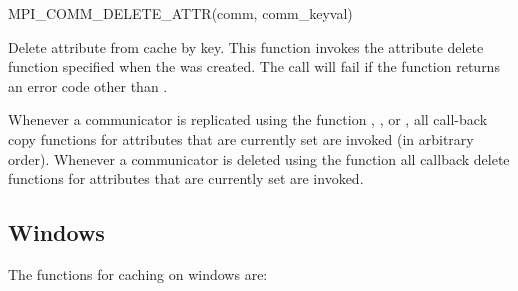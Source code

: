 %
\begin{funcdef}{MPI\_COMM\_DELETE\_ATTR}{(\mbox{comm}, \mbox{comm\_keyval})}
\end{funcdef}

Delete attribute from cache by key. This function invokes the
attribute delete function 
specified when the  was created.
The call will fail if the  function returns an
error code other than .

Whenever a communicator is replicated using the function
, ,
 or ,
all call-back copy functions for attributes
that are currently set are invoked (in arbitrary order).
Whenever a communicator is deleted using the function
 all callback delete functions for attributes
that are currently set are invoked.

\subsection{Windows}
\label{sec:ei-attr:windows}

The functions for caching on windows are:

